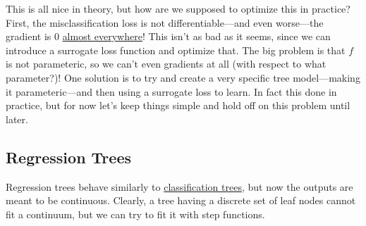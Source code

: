   This is all nice in theory, but how are we supposed to optimize this in practice? First, the misclassification loss is not differentiable---and even worse---the gradient is $0$ \hyperref[mt-def:almost_everywhere]{almost everywhere}! This isn't as bad as it seems, since we can introduce a surrogate loss function and optimize that. The big problem is that $f$ is not parameteric, so we can't even gradients at all (with respect to what parameter?)! One solution is to try and create a very specific tree model---making it parameteric---and then using a surrogate loss to learn. In fact this done in practice, but for now let's keep things simple and hold off on this problem until later. 

\subsection{Regression Trees}

  Regression trees behave similarly to \hyperref[def:classification-trees]{classification trees}, but now the outputs are meant to be continuous. Clearly, a tree having a discrete set of leaf nodes cannot fit a continuum, but we can try to fit it with step functions. 

